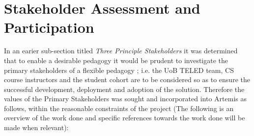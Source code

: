 \section{Stakeholder Assessment and Participation}

In an earier sub-section titled  \textit{Three Principle Stakeholders} it was determined that to enable a desirable pedagogy it would be prudent to investigate the primary stakeholders of a flexible pedagogy \cite{Gordon2014}; i.e. the UoB TELED team, CS course instructors and the student cohort are to be considered so as to ensure the successful development, deployment and adoption of the solution. Therefore the values of the Primary Stakeholders was sought and incorporated into Artemis as follows, within the reasonable constraints of the project (The following is an overview of the work done and specific references towards the work done will be made when relevant):

